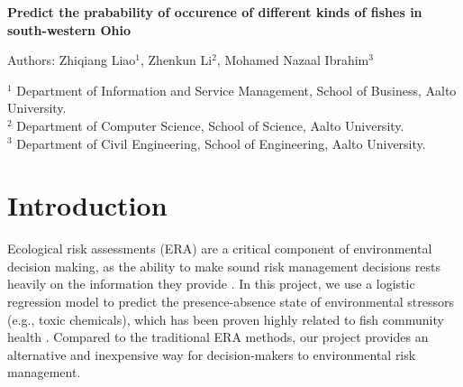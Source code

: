 \documentclass[a4paper]{artikel3}
\begin{document}
\begin{center}
{\Large \onehalfspacing \bf Predict the prabability of occurence of different kinds of fishes in south-western Ohio}
\end{center}
\vspace{10pt}
\begin{center}
\large Authors: Zhiqiang Liao$^1$, Zhenkun Li$^2$, Mohamed Nazaal Ibrahim$^3$\\
\end{center}

\begin{flushleft}
$^1$ Department of Information and Service Management, School of Business, Aalto University. \\
$^2$ Department of Computer Science, School of Science, Aalto University. \\
$^3$ Department of Civil Engineering, School of Engineering, Aalto University. 
\end{flushleft}

        

\normalsize
\section{Introduction}
Ecological risk assessments (ERA) are a critical component of environmental decision making, as the ability to make sound risk management decisions rests heavily on the information they provide \cite{barnthouse2007population}. In this project, we use a logistic regression model to predict the presence-absence state of environmental stressors (e.g., toxic chemicals), which has been proven highly related to fish community health \cite{miltner2010method}. Compared to the traditional ERA methods, our project provides an alternative and inexpensive way for decision-makers to environmental risk management.
\end{document}
